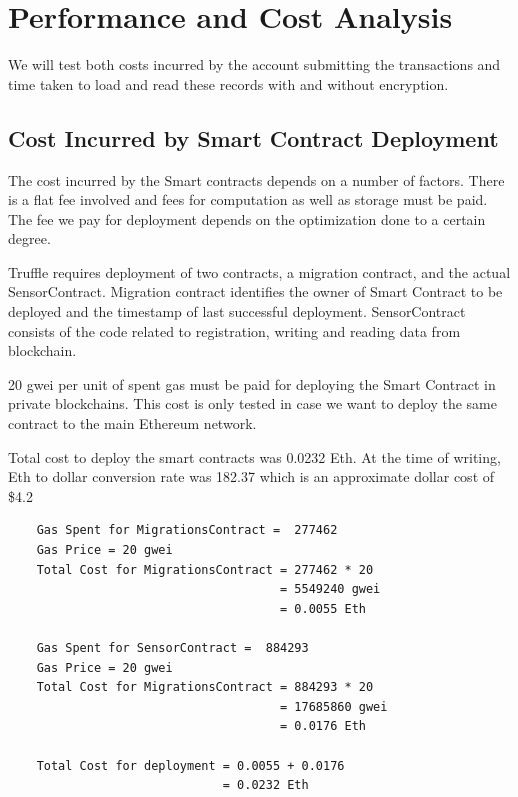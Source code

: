 \documentclass[11pt,openright]{report}
\begin{document}
\chapter{Performance and Cost Analysis}
\label{chapter:experiment_results}
We will test both costs incurred by the account submitting the transactions and time taken to load and read these records with and without encryption.

\section{Cost Incurred by Smart Contract Deployment}
The cost incurred by the Smart contracts depends on a number of factors. There is a flat fee involved and fees for computation as well as storage must be paid. The fee we pay for deployment depends on the optimization done to a certain degree. 

Truffle requires deployment of two contracts, a migration contract, and the actual SensorContract. Migration contract identifies the owner of Smart Contract to be deployed and the timestamp of last successful deployment. SensorContract consists of the code related to registration, writing and reading data from blockchain. 

20 gwei per unit of spent gas must be paid for deploying the Smart Contract in private blockchains. This cost is only tested in case we want to deploy the same contract to the main Ethereum network. 

Total cost to deploy the smart contracts was 0.0232 Eth. At the time of writing, Eth to dollar conversion rate was 182.37 which is an approximate dollar cost of \$4.2


\begin{lstlisting}
    Gas Spent for MigrationsContract =  277462
    Gas Price = 20 gwei
    Total Cost for MigrationsContract = 277462 * 20
                                      = 5549240 gwei
                                      = 0.0055 Eth
    
    Gas Spent for SensorContract =  884293
    Gas Price = 20 gwei
    Total Cost for MigrationsContract = 884293 * 20
                                      = 17685860 gwei
                                      = 0.0176 Eth                           
    
    Total Cost for deployment = 0.0055 + 0.0176
                              = 0.0232 Eth
\end{lstlisting}
\end{document}
